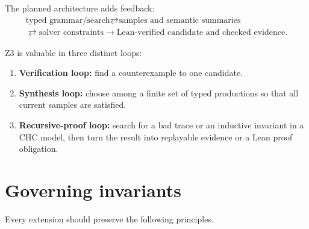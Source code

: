 \documentclass[10pt,letterpaper,oneside]{report}
\begin{document}
The planned architecture adds feedback:
\[
\begin{gathered}
  \text{typed grammar/search}
  \rightleftarrows
  \text{samples and semantic summaries}\\
  \rightleftarrows
  \text{solver constraints}
  \longrightarrow
  \text{Lean-verified candidate and checked evidence}.
\end{gathered}
\]

Z3 is valuable in three distinct loops:

\begin{enumerate}
\item \textbf{Verification loop:} find a counterexample to one candidate.
\item \textbf{Synthesis loop:} choose among a finite set of typed productions so that all current samples are satisfied.
\item \textbf{Recursive-proof loop:} search for a bad trace or an inductive invariant in a CHC model, then turn the result into replayable evidence or a Lean proof obligation.
\end{enumerate}

\section{Governing invariants}

Every extension should preserve the following principles.
\end{document}
